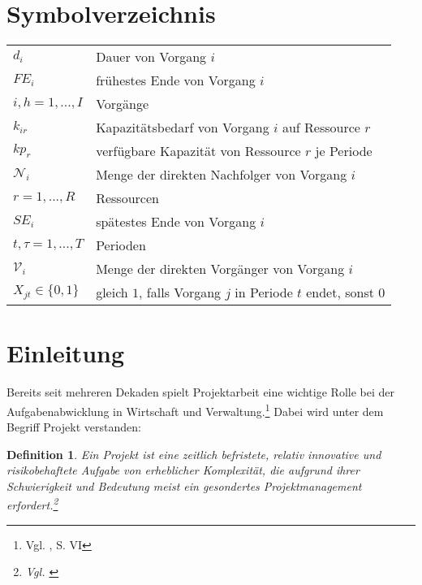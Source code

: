 \documentclass[a4paper,12pt,parskip,bibtotoc,liststotoc]{article}
\newtheorem{mydef}{Definition}
\begin{document}
\section*{Symbolverzeichnis}
\begin{table}[h!]
    \vspace*{-3mm}
        \hspace*{2mm}
      \renewcommand{\arraystretch}{1,5}
    \begin{tabular}{ll} 
$d_i$ & Dauer von Vorgang $i$ \\
$FE_i$& frühestes Ende von Vorgang $i$\\
$i,h=1,...,I$ & Vorgänge \\
$k_{ir}$& Kapazitätsbedarf von Vorgang $i$ auf Ressource $r$\\
$kp_r$ & verfügbare Kapazität von Ressource $r$ je Periode\\
$\mathcal{N}_i$ & Menge der direkten Nachfolger von Vorgang $i$ \\
$r=1,...,R$ & Ressourcen \\
$SE_i$& spätestes Ende von Vorgang $i$\\
$t,\tau=1,..., T$ & Perioden\\
$\mathcal{V}_i$ & Menge der direkten Vorgänger von Vorgang $i$ \\
$X_{jt}\in\{0,1\}$ & gleich $1$, falls Vorgang $j$ in Periode $t$ endet, sonst $0$
  	\end{tabular}
\end{table}
\newpage
{}   %


\section{Einleitung} \label{start}
Bereits seit mehreren Dekaden spielt Projektarbeit eine wichtige Rolle bei der Aufgabenabwicklung in Wirtschaft und Verwaltung.\footnote{Vgl. \cite{zimmermann2006projektplanung}, S. VI} Dabei wird unter dem Begriff Projekt verstanden:

\begin{mydef}
\glqq Ein Projekt ist eine zeitlich befristete, relativ innovative und risikobehaftete Aufgabe von erheblicher Komplexität, die aufgrund ihrer Schwierigkeit und Bedeutung meist ein gesondertes Projektmanagement erfordert.\grqq\footnote{Vgl. \cite{projektdef}}
\end{mydef}
\end{document}
